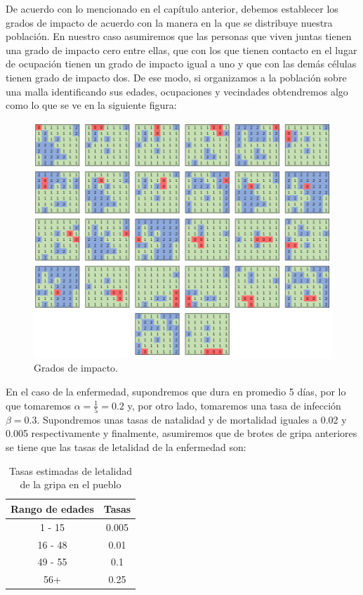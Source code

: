 De acuerdo con lo mencionado en el capítulo anterior, debemos establecer los grados de impacto de acuerdo con la manera en la que se distribuye nuestra población. En nuestro caso asumiremos que las personas que viven juntas tienen una grado de impacto cero entre ellas, que con los que tienen contacto en el lugar de ocupación tienen un grado de impacto igual a uno y que con las demás células tienen grado de impacto dos. De ese modo, si organizamos a la población sobre una malla identificando sus edades, ocupaciones y vecindades obtendremos algo como lo que se ve en la siguiente figura:

\begin{figure}[h]\label{fig:edadesYOcupaciones}
  \centering
    \includegraphics[width=1\textwidth]{Imagenes/vecindadesCap4.PNG}
    \caption{Grados de impacto.}
\end{figure}

En el caso de la enfermedad, supondremos que dura en promedio 5 días, por lo que tomaremos $\alpha=\frac{1}{5}=0.2$ y, por otro lado, tomaremos una tasa de infección $\beta=0.3$. Supondremos unas tasas de natalidad y de mortalidad iguales a 0.02 y 0.005 respectivamente y finalmente, asumiremos que de brotes de gripa anteriores se tiene que las tasas de letalidad de la enfermedad son:

\newpage

\begin{table}[h]
\begin{center}
\begin{tabular}{| c | c |}
\hline
Rango de edades & Tasas \\ \hline
1 - 15 & 0.005 \\
16 - 48 & 0.01 \\
49 - 55 & 0.1 \\
56+ & 0.25 \\\hline
\end{tabular}
\caption{Tasas estimadas de letalidad de la gripa en el pueblo}
\end{center}
\end{table}

